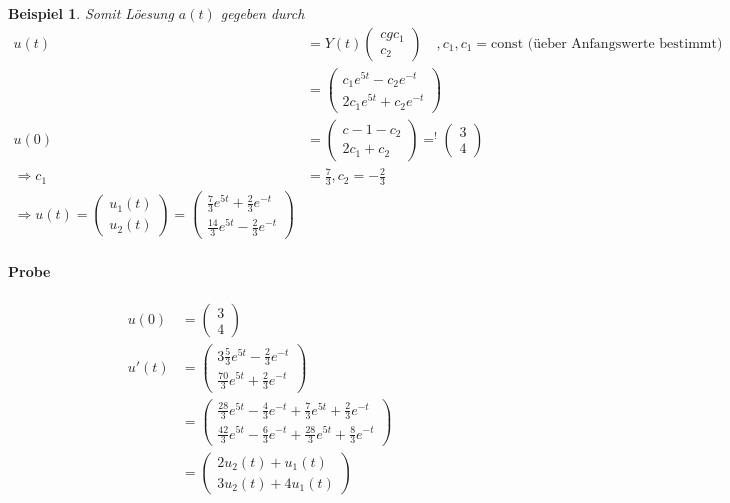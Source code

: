 \documentclass[11pt]{article}
\newcounter{myCounter}[section]
\newtheorem{Bsp}[myCounter]{Beispiel}
\begin{document}
\begin{Bsp}
  Somit L\"oesung $a(t)$ gegeben durch
  \begin{align*}
    u(t) &= Y(t) \begin{pmatrix} cgc_1 \\ c_2 \end{pmatrix} \quad, c_1, c_1 = \text{const
      (\"ueber Anfangswerte bestimmt)} \\
      &= \begin{pmatrix} c_1 e^{5t} - c_2 e^{-t} \\ 2c_1e^{5t} + c_2e^{-t}
    \end{pmatrix} \\
  u(0) &= \begin{pmatrix} c-1 - c_2 \\ 2 c_1 + c_2 \end{pmatrix} \mathop{=}^!
  \begin{pmatrix} 3 \\ 4 \end{pmatrix} \\
    \Rightarrow c_1 &= \frac{7}{3}, c_2 = - \frac{2}{3} \\
\Rightarrow u(t) = \begin{pmatrix} u_1(t) \\ u_2(t) \end{pmatrix} =
  \begin{pmatrix} \frac{7}{3} e^{5t} + \frac{2}{3} e^{-t} \\ \frac{14}{3} e^{5t}
  - \frac{2}{3} e^{-t} \end{pmatrix}
  \end{align*}
  \paragraph{Probe}
  \begin{align*}
    u(0) &= \begin{pmatrix} 3 \\ 4 \end{pmatrix} \\
  u'(t) &= \begin{pmatrix} 3 \frac{5}{3} e^{5t} - \frac{2}{3} e^{-t} \\
  \frac{70}{3} e^{5t} + \frac{2}{3} e^{-t} \end{pmatrix} \\
&= \begin{pmatrix} \frac{28}{3} e^{5t} - \frac{4}{3} e^{-t} + \frac{7}{3} e^{5t}
+ \frac{2}{3} e^{-t} \\ \frac{42}{3} e^{5t} - \frac{6}{3} e^{-t} + \frac{28}{3}
e^{5t} + \frac{8}{3} e^{-t} \end{pmatrix} \\
&= \begin{pmatrix} 2 u_2(t) + u_1(t) \\ 3 u_2(t) + 4 u_1(t) \end{pmatrix}
  \end{align*}
\end{Bsp}
\end{document}
